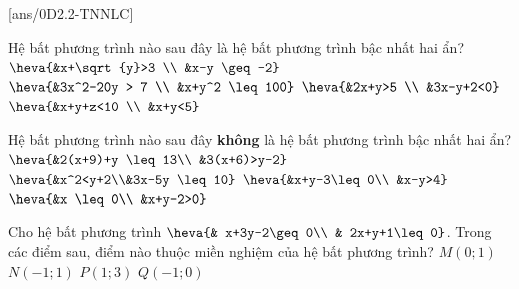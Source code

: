 [ans/0D2.2-TNNLC]
\begin{ex}%
	Hệ bất phương trình nào sau đây là hệ bất phương trình bậc nhất hai ẩn?
	\choice
	{$\heva{&x+\sqrt{y}>3 \\ &x-y \geq -2}$}
	{$\heva{&3x^2-20y > 7 \\ &x+y^2 \leq 100}$}
	{\True $\heva{&2x+y>5 \\ &3x-y+2<0}$}
	{$\heva{&x+y+z<10 \\ &x+y<5}$}
\end{ex}
\begin{ex}%
	Hệ bất phương trình nào sau đây \textbf{không} là hệ bất phương trình bậc nhất hai ẩn?
	\choice
	{$\heva{&2(x+9)+y \leq 13\\	&3(x+6)>y-2}$}
	{\True $\heva{&x^2<y+2\\&3x-5y \leq 10}$}
	{$\heva{&x+y-3\leq 0\\	&x-y>4}$}
	{$\heva{&x \leq 0\\	&x+y-2>0}$}
\end{ex}
\begin{ex}%
	Cho hệ bất phương trình $\heva{& x+3y-2\geq 0\\ & 2x+y+1\leq 0}$. Trong các điểm sau, điểm nào thuộc miền nghiệm của hệ bất phương trình?
	\choice
	{$M\left(0;1\right)$}
	{\True $N\left(-1;1\right)$}
	{$P\left(1;3\right)$}
	{$Q\left(-1;0\right)$}
\end{ex}

